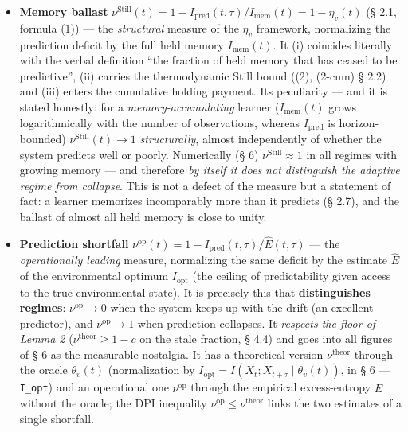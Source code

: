 \documentclass[pdflatex,sn-mathphys-ay]{sn-jnl}
\begin{document}
\begin{itemize}

\item

  \textbf{Memory ballast} \(\nu^{\text{Still}}(t) = 1 - I_{\text{pred}}(t,\tau)/I_{\text{mem}}(t) = 1 - \eta_v(t)\) (§ 2.1, formula (1)) --- the \emph{structural} measure of the \(\eta_v\) framework, normalizing the prediction deficit by the full held memory \(I_{\text{mem}}(t)\). It (i) coincides literally with the verbal definition ``the fraction of held memory that has ceased to be predictive'', (ii) carries the thermodynamic Still bound ((2), (2-cum) § 2.2) and (iii) enters the cumulative holding payment. Its peculiarity --- and it is stated honestly: for a \emph{memory-accumulating} learner (\(I_{\text{mem}}(t)\) grows logarithmically with the number of observations, whereas \(I_{\text{pred}}\) is horizon-bounded) \(\nu^{\text{Still}}(t) \to 1\) \emph{structurally}, almost independently of whether the system predicts well or poorly. Numerically (§ 6) \(\nu^{\text{Still}} \approx 1\) in all regimes with growing memory --- and therefore \emph{by itself it does not distinguish the adaptive regime from collapse}. This is not a defect of the measure but a statement of fact: a learner memorizes incomparably more than it predicts (§ 2.7), and the ballast of almost all held memory is close to unity.

\item

  \textbf{Prediction shortfall} \(\nu^{\text{op}}(t) = 1 - I_{\text{pred}}(t,\tau)/\hat E(t,\tau)\) --- the \emph{operationally leading} measure, normalizing the same deficit by the estimate \(\hat E\) of the environmental optimum \(I_{\text{opt}}\) (the ceiling of predictability given access to the true environmental state). It is precisely this that \textbf{distinguishes regimes}: \(\nu^{\text{op}} \to 0\) when the system keeps up with the drift (an excellent predictor), and \(\nu^{\text{op}} \to 1\) when prediction collapses. It \emph{respects the floor of Lemma 2} (\(\nu^{\text{theor}} \ge 1 - c\) on the stale fraction, § 4.4) and goes into all figures of § 6 as the measurable nostalgia. It has a theoretical version \(\nu^{\text{theor}}\) through the oracle \(\theta_v(t)\) (normalization by \(I_{\text{opt}} = I(X_t; X_{t+\tau}\mid \theta_v(t))\), in § 6 --- \texttt{I\_opt}) and an operational one \(\nu^{\text{op}}\) through the empirical excess-entropy \(\hat E\) without the oracle; the DPI inequality \(\nu^{\text{op}} \le \nu^{\text{theor}}\) links the two estimates of a single shortfall.

\end{itemize}
\end{document}
